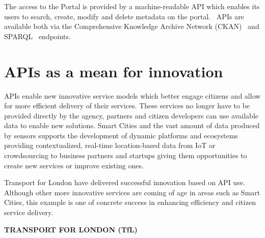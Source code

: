 The access to the Portal is provided by a machine-readable API which enables its
users to search, create, modify and delete metadata on the portal.~\citep{edp_data_portal} APIs are
available both via the Comprehensive Knowledge Archive Network (CKAN)~\citep{edp_api_v3} and
SPARQL~\citep{edp_sparql} endpoints.

\section{APIs as a mean for innovation}

APIs enable new innovative service models which better engage citizens and allow
for more efficient delivery of their services. These services no longer have to
be provided directly by the agency, partners and citizen developers can use
available data to enable new solutions. Smart Cities and the vast amount of data
produced by sensors supports the development of dynamic platforms and ecosystems
providing contextualized, real-time location-based data from IoT or crowdsourcing
to business partners and startups giving them opportunities to create new services
or improve existing ones.

Transport for London have delivered successful innovation based on API use.
Although other more innovative services are coming of age in areas such as
Smart Cities, this example is one of concrete success in enhancing efficiency
and citizen service delivery.

\textbf{TRANSPORT FOR LONDON (TfL)}

